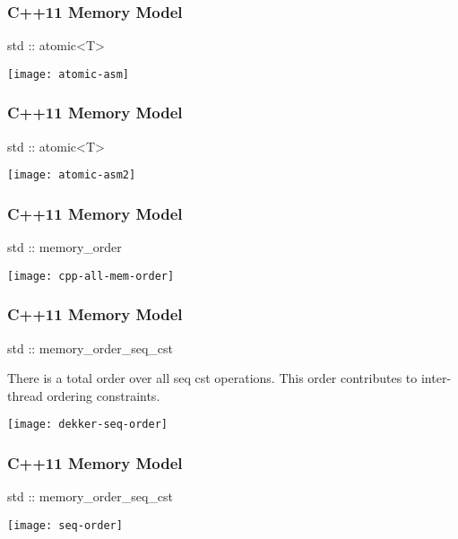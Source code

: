 \begin{frame}
    \frametitle{C++11 Memory Model}
    \LARGE
    std :: atomic<T>
    
    \texttt{[image: atomic-asm]}
\end{frame}

\begin{frame}
    \frametitle{C++11 Memory Model}
    \LARGE
    std :: atomic<T>
    
    \texttt{[image: atomic-asm2]}
\end{frame}
\begin{frame}
    \frametitle{C++11 Memory Model}
    \LARGE
    std :: memory\_order
    
    \texttt{[image: cpp-all-mem-order]}
\end{frame}


\begin{frame}
    \frametitle{C++11 Memory Model}
    \LARGE
    std :: memory\_order\_seq\_cst
    
    \normalsize
    There is a total order over all seq cst operations. This order
    contributes to inter-thread ordering constraints.
    
    \texttt{[image: dekker-seq-order]}
\end{frame}



\begin{frame}
    \frametitle{C++11 Memory Model}
    \LARGE
    std :: memory\_order\_seq\_cst
    
    \centering
    \texttt{[image: seq-order]}
\end{frame}


